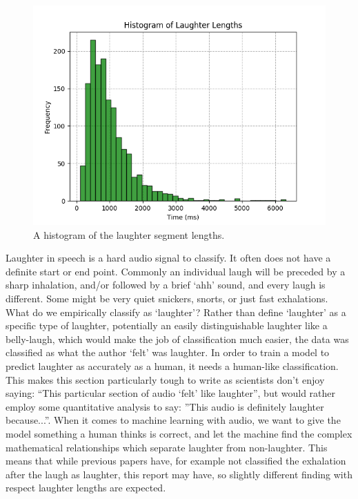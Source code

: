\documentclass[a4paper,11pt,notitlepage]{article}
\begin{document}
\begin{figure}[H]
	\centering
	\vspace{0.5cm}
	\includegraphics[scale = 0.8]{figs/laughter_length_histogram.png}
	\caption{A histogram of the laughter segment lengths.}
	\label{laughter_length_histogram}
\end{figure}
Laughter in speech is a hard audio signal to classify. It often does not have a definite start or end point. Commonly an individual laugh will be preceded by a sharp inhalation, and/or followed by a brief `ahh' sound, and every laugh is different. Some might be very quiet snickers, snorts, or just fast exhalations. What do we empirically classify as `laughter'? Rather than define `laughter' as a specific type of laughter, potentially an easily distinguishable laughter like a belly-laugh, which would make the job of classification much easier, the data was classified as what the author `felt' was laughter. In order to train a model to predict laughter as accurately as a human, it needs a human-like classification. This makes this section particularly tough to write as scientists don't enjoy saying: ``This particular section of audio `felt' like laughter'', but would rather employ some quantitative analysis to say: ''This audio is definitely laughter because...''. When it comes to machine learning with audio, we want to give the model something a human thinks is correct, and let the machine find the complex mathematical relationships which separate laughter from non-laughter. This means that while previous papers have, for example not classified the exhalation after the laugh as laughter\cite{bachorowski2001acoustic}, this report may have, so slightly different finding with respect laughter lengths are expected. \\
\end{document}
